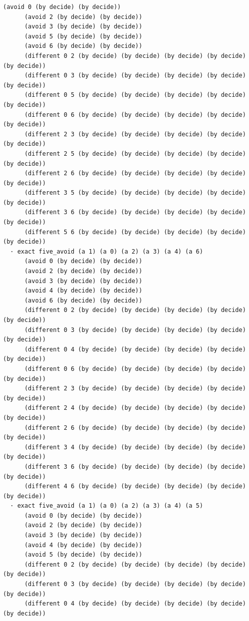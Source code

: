 \documentclass[11pt,a4paper]{article}
\begin{document}
\begin{Verbatim}[breaklines,breakanywhere,fontsize=\footnotesize]
      (avoid 0 (by decide) (by decide))
      (avoid 2 (by decide) (by decide))
      (avoid 3 (by decide) (by decide))
      (avoid 5 (by decide) (by decide))
      (avoid 6 (by decide) (by decide))
      (different 0 2 (by decide) (by decide) (by decide) (by decide) (by decide))
      (different 0 3 (by decide) (by decide) (by decide) (by decide) (by decide))
      (different 0 5 (by decide) (by decide) (by decide) (by decide) (by decide))
      (different 0 6 (by decide) (by decide) (by decide) (by decide) (by decide))
      (different 2 3 (by decide) (by decide) (by decide) (by decide) (by decide))
      (different 2 5 (by decide) (by decide) (by decide) (by decide) (by decide))
      (different 2 6 (by decide) (by decide) (by decide) (by decide) (by decide))
      (different 3 5 (by decide) (by decide) (by decide) (by decide) (by decide))
      (different 3 6 (by decide) (by decide) (by decide) (by decide) (by decide))
      (different 5 6 (by decide) (by decide) (by decide) (by decide) (by decide))
  · exact five_avoid (a 1) (a 0) (a 2) (a 3) (a 4) (a 6)
      (avoid 0 (by decide) (by decide))
      (avoid 2 (by decide) (by decide))
      (avoid 3 (by decide) (by decide))
      (avoid 4 (by decide) (by decide))
      (avoid 6 (by decide) (by decide))
      (different 0 2 (by decide) (by decide) (by decide) (by decide) (by decide))
      (different 0 3 (by decide) (by decide) (by decide) (by decide) (by decide))
      (different 0 4 (by decide) (by decide) (by decide) (by decide) (by decide))
      (different 0 6 (by decide) (by decide) (by decide) (by decide) (by decide))
      (different 2 3 (by decide) (by decide) (by decide) (by decide) (by decide))
      (different 2 4 (by decide) (by decide) (by decide) (by decide) (by decide))
      (different 2 6 (by decide) (by decide) (by decide) (by decide) (by decide))
      (different 3 4 (by decide) (by decide) (by decide) (by decide) (by decide))
      (different 3 6 (by decide) (by decide) (by decide) (by decide) (by decide))
      (different 4 6 (by decide) (by decide) (by decide) (by decide) (by decide))
  · exact five_avoid (a 1) (a 0) (a 2) (a 3) (a 4) (a 5)
      (avoid 0 (by decide) (by decide))
      (avoid 2 (by decide) (by decide))
      (avoid 3 (by decide) (by decide))
      (avoid 4 (by decide) (by decide))
      (avoid 5 (by decide) (by decide))
      (different 0 2 (by decide) (by decide) (by decide) (by decide) (by decide))
      (different 0 3 (by decide) (by decide) (by decide) (by decide) (by decide))
      (different 0 4 (by decide) (by decide) (by decide) (by decide) (by decide))

\end{Verbatim}
\end{document}
